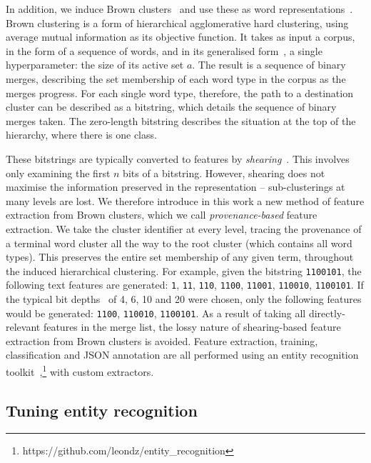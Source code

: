 \documentclass[10pt,journal,compsoc]{IEEEtran}
\begin{document}
In addition, we induce Brown clusters~\cite{brown1992class} and use these as word representations~\cite{turian2009preliminary}.
Brown clustering is a form of hierarchical agglomerative hard clustering, using average mutual information as its objective function.
It takes as input a corpus, in the form of a sequence of words, and in its generalised form~\cite{derczynski2016generalised}, a single hyperparameter: the size of its active set $a$.
The result is a sequence of binary merges, describing the set membership of each word type in the corpus as the merges progress.
For each single word type, therefore, the path to a destination cluster can be described as a bitstring, which details the sequence of binary merges taken.
The zero-length bitstring describes the situation at the top of the hierarchy, where there is one class.

These bitstrings are typically converted to features by \emph{shearing}~\cite{derczynski2016generalised}.
This involves only examining the first $n$ bits of a bitstring.
However, shearing does not maximise the information preserved in the representation -- sub-clusterings at many levels are lost.
We therefore introduce in this work a new method of feature extraction from Brown clusters, which we call {\em provenance-based} feature extraction.
We take the cluster identifier at every level, tracing the provenance of a terminal word cluster all the way to the root cluster (which contains all word types).
This preserves the entire set membership of any given term, throughout the induced hierarchical clustering.
For example, given the bitstring {\tt 1100101}, the following text features are generated: {\tt 1}, {\tt 11}, {\tt 110}, {\tt 1100}, {\tt 11001}, {\tt 110010}, {\tt 1100101}.
If the typical bit depths~\cite{ratinov2009design} of 4, 6, 10 and 20 were chosen, only the following features would be generated: {\tt 1100}, {\tt 110010}, {\tt 1100101}.
As a result of taking all directly-relevant features in the merge list, the lossy nature of shearing-based feature extraction from Brown clusters is avoided.
Feature extraction, training, classification and JSON annotation are all performed using an entity recognition toolkit~\cite{derczynski2015usfd},\footnote{https://github.com/leondz/entity\_recognition} with custom extractors.


\subsection{Tuning entity recognition}
\end{document}
